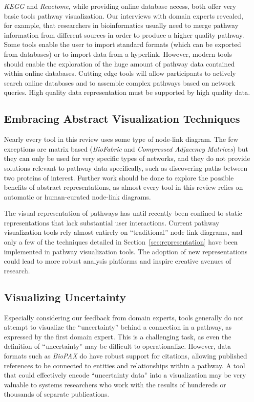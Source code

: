 \documentclass[review,journal]{vgtc}         %
\newcounter{task}
\begin{document}
\emph{KEGG} and \emph{Reactome}, while providing online database access, both offer very basic tools pathway visualization. Our interviews with domain experts revealed, for example, that researchers in bioinformatics usually need to merge pathway information from different sources in order to produce a higher quality pathway. Some tools enable the user to import standard formats (which can be exported from databases) or to import data from a hyperlink. However, modern tools should enable the exploration of the huge amount of pathway data contained within online databases. Cutting edge tools will allow participants to actively search online databases and to assemble complex pathways based on network queries. High quality data representation must be supported by high quality data.

\subsection{Embracing Abstract Visualization Techniques}

Nearly every tool in this review uses some type of node-link diagram. The few exceptions are matrix based (\emph{BioFabric} and \emph{Compressed Adjacency Matrices}) but they can only be used for very specific types of networks, and they do not provide solutions relevant to pathway data specifically, such as discovering paths between two proteins of interest. Further work should be done to explore the possible benefits of abstract representations, as almost every tool in this review relies on automatic or human-curated node-link diagrams.

The visual representation of pathways has until recently been confined to static representations that lack substantial user interactions. Current pathway visualization tools rely almost entirely on ``traditional'' node link diagrams, and only a few of the techniques detailed in Section~\ref{sec:representation} have been implemented in pathway visualization tools. The adoption of new representations could lead to more robust analysis platforms and inspire creative avenues of research.

\subsection{Visualizing Uncertainty}

Especially considering our feedback from domain experts, tools generally do not attempt to visualize the ``uncertainty'' behind a connection in a pathway, as expressed by the first domain expert. This is a challenging task, as even the definition of ``uncertainty'' may be difficult to operationalize. However, data formats such as \emph{BioPAX} do have robust support for citations, allowing published references to be connected to entities and relationships within a pathway. A tool that could effectively encode ``uncertainty data'' into a visualization may be very valuable to systems researchers who work with the results of hundereds or thousands of separate publications.
\end{document}

